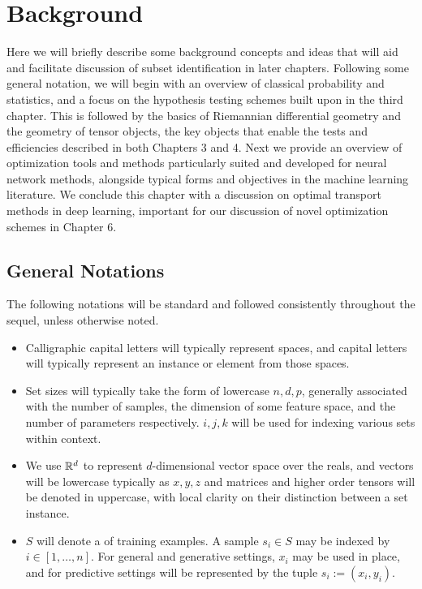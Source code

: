 \chapter{Background}\label{sec:bknd}

Here we will briefly describe some background concepts and ideas that will aid and facilitate discussion of subset identification in later chapters. 
Following some general notation,
we will begin with an overview
of classical probability and statistics,
and a focus on the hypothesis testing
schemes built upon in the third chapter.
This is followed by the basics of Riemannian differential geometry
and the geometry of tensor objects,
the key objects that enable the 
tests and efficiencies described in both 
Chapters 3 and 4.
Next we provide
an overview of optimization tools
and methods particularly suited
and developed for neural network methods,
alongside typical forms and objectives 
in the machine learning literature.
We conclude this chapter
with a discussion on optimal transport
methods in deep learning, important
for our discussion of novel optimization schemes
in Chapter 6.

\section{General Notations}
The following notations will be standard and followed consistently throughout the sequel, unless otherwise noted.
\begin{itemize}
\item Calligraphic capital letters will typically represent spaces, and capital letters will typically represent an instance or element from those spaces.

\item Set sizes will typically take the form of lowercase $n,d,p$, generally associated with the number of samples, the dimension of some feature space, and the number of parameters respectively. $i,j,k$ will be used for indexing various sets within context.

\item We use $\mathbb{R}^d$ to represent $d$-dimensional vector space over the reals, and vectors will be lowercase typically as $x,y,z$ and matrices and higher order tensors will be denoted in uppercase, with local clarity on their distinction between a set instance.

\item $S$ will denote a of training examples.
A sample $s_i\in S$ may be indexed by $i \in [1,\ldots,n]$. 
For general and generative settings, $x_i$ may be used in place, and for predictive settings will be represented by the tuple $s_i:=(x_i,y_i)$.

\end{itemize}

